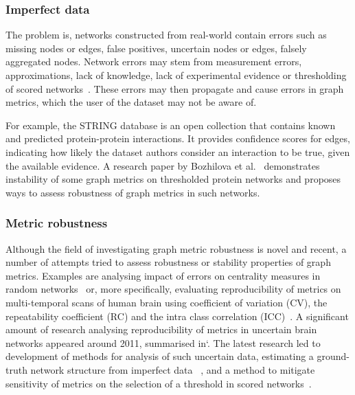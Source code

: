 \subsubsection*{Imperfect data}

The problem is, networks constructed from real-world contain errors such as missing nodes or edges, false positives, uncertain nodes or edges, falsely aggregated nodes.
Network errors may stem from measurement errors, approximations, lack of knowledge, lack of experimental evidence or thresholding of scored networks~\cite{Wang2012,MarsdenNetworkDataMeasurement1990,JonesChallengesLimitationsQuantifying2010}.
These errors may then propagate and cause errors in graph metrics, which the user of the dataset may not be aware of. 

For example, the STRING database\cite{Szklarczyk2019} is an open collection that contains known and predicted protein-protein interactions.
It provides confidence scores for edges, indicating how likely the dataset authors consider an interaction to be true, given the available evidence.
A research paper by Bozhilova et al.~\cite{Bozhilova2019} demonstrates instability of some graph metrics on thresholded protein networks and proposes ways to assess robustness of graph metrics in such networks.

\subsubsection*{Metric robustness}

Although the field of investigating graph metric robustness is novel and recent, a number of attempts tried to assess robustness or stability properties of graph metrics.
Examples are analysing impact of errors on centrality measures in random networks~\cite{BorgattiRobustnessCentralityMeasures2006} or, more specifically, evaluating reproducibility of metrics on multi-temporal scans of human brain using coefficient of variation (CV), the repeatability coefficient (RC) and the intra class correlation (ICC)~\cite{VaessenEffectReproducibilityDifferent2010,DennisTestRetestReliabilityGraph2012}.
A significant amount of research analysing reproducibility of metrics in uncertain brain networks appeared around 2011, summarised in`\cite{TelesfordExplorationGraphMetric2013}.
The latest research led to development of methods for analysis of such uncertain data, estimating a ground-truth network structure from imperfect data ~\cite{Martin2016,Newman2018}, and a method to mitigate sensitivity of metrics on the selection of a threshold in scored networks~\cite{Drakesmith2015}.

